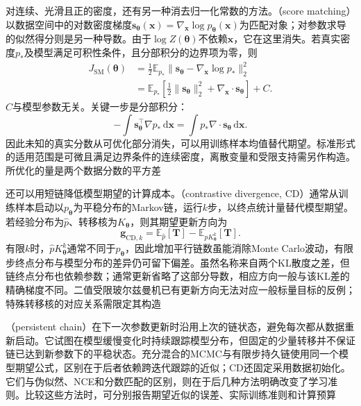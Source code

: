 对连续、光滑且正的密度，还有另一种消去归一化常数的方法。（score matching）以数据空间中的对数密度梯度$\bm{s}_{\bm{\theta}}(\bm{x})=\nabla_{\bm{x}}\log p_{\bm{\theta}}(\bm{x})$为匹配对象；对参数求导的似然得分则是另一种导数。由于$\log Z(\bm{\theta})$不依赖$\bm{x}$，它在这里消失。若真实密度$p_*$及模型满足可积性条件，且分部积分的边界项为零，则
\begin{equation}
  \begin{aligned}
    J_{\mathrm{SM}}(\bm{\theta})
      &=\frac12\mathbb{E}_{p_*}
          \lVert\bm{s}_{\bm{\theta}}-\nabla_{\bm{x}}\log p_*\rVert_2^2\\
      &=\mathbb{E}_{p_*}\!\left[
          \frac12\lVert\bm{s}_{\bm{\theta}}\rVert_2^2+
          \nabla_{\bm{x}}\!\cdot\bm{s}_{\bm{\theta}}
        \right]+C.
  \end{aligned}
  \label{eq:pgm-parameter-learning-score-matching}
\end{equation}
$C$与模型参数无关。关键一步是分部积分：
\[
  -\int\bm{s}_{\bm{\theta}}^\top\nabla p_*\,\mathrm{d}\bm{x}
  =\int p_*\nabla\cdot\bm{s}_{\bm{\theta}}\,\mathrm{d}\bm{x}.
\]
因此未知的真实分数从可优化部分消失，可以用训练样本均值替代期望。标准形式的适用范围是可微且满足边界条件的连续密度，离散变量和受限支持需另作构造。所优化的量是两个数据分数的平方差

还可以用短链降低模型期望的计算成本。（contrastive divergence, CD）通常从训练样本启动以$p_{\bm{\theta}}$为平稳分布的Markov链，运行$k$步，以终点统计量替代模型期望。若经验分布为$\widehat p$、转移核为$K_{\bm{\theta}}$，则其期望更新方向为
\[
  \bm{g}_{\mathrm{CD},k}
    =\mathbb{E}_{\widehat p}[\bm{T}]
      -\mathbb{E}_{\widehat pK_{\bm{\theta}}^k}[\bm{T}].
\]
有限$k$时，$\widehat pK_{\bm{\theta}}^k$通常不同于$p_{\bm{\theta}}$，因此增加平行链数虽能消除Monte Carlo波动，有限步终点分布与模型分布的差异仍可留下偏差。虽然名称来自两个KL散度之差，但链终点分布也依赖参数；通常更新省略了这部分导数，相应方向一般与该KL差的精确梯度不同。二值受限玻尔兹曼机已有更新方向无法对应一般标量目标的反例；特殊转移核的对应关系需限定其构造

（persistent chain）在下一次参数更新时沿用上次的链状态，避免每次都从数据重新启动。它试图在模型缓慢变化时持续跟踪模型分布，但固定的少量转移并不保证链已达到新参数下的平稳状态。充分混合的MCMC与有限步持久链使用同一个模型期望公式，区别在于后者依赖跨迭代跟踪的近似；CD还固定采用数据初始化。它们与伪似然、NCE和分数匹配的区别，则在于后几种方法明确改变了学习准则。比较这些方法时，可分别报告期望近似的误差、实际训练准则和计算预算

